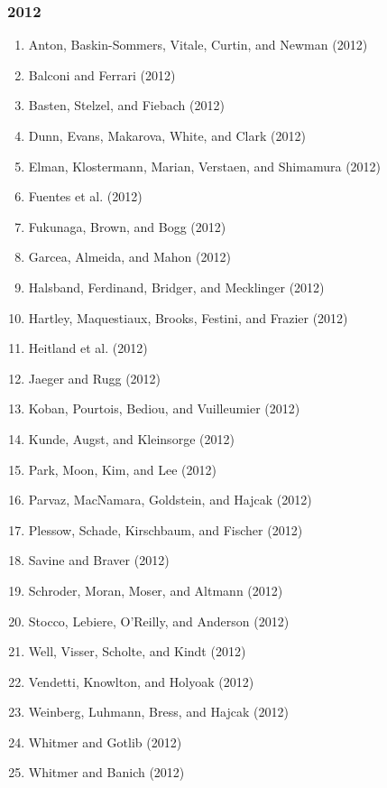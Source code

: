 \documentclass[english,man]{apa6}
\providecommand{\tightlist}{%
  \setlength{\itemsep}{0pt}\setlength{\parskip}{0pt}}
\theoremstyle{definition}
\theoremstyle{definition}
\theoremstyle{definition}
\theoremstyle{remark}
\begin{document}
\subsubsection{2012}\label{section-36}

\begin{enumerate}
\def\labelenumi{\arabic{enumi})}
\tightlist
\item
  Anton, Baskin-Sommers, Vitale, Curtin, and Newman (2012)
\item
  Balconi and Ferrari (2012)
\item
  Basten, Stelzel, and Fiebach (2012)
\item
  Dunn, Evans, Makarova, White, and Clark (2012)
\item
  Elman, Klostermann, Marian, Verstaen, and Shimamura (2012)
\item
  Fuentes et al. (2012)
\item
  Fukunaga, Brown, and Bogg (2012)
\item
  Garcea, Almeida, and Mahon (2012)
\item
  Halsband, Ferdinand, Bridger, and Mecklinger (2012)
\item
  Hartley, Maquestiaux, Brooks, Festini, and Frazier (2012)
\item
  Heitland et al. (2012)
\item
  Jaeger and Rugg (2012)
\item
  Koban, Pourtois, Bediou, and Vuilleumier (2012)
\item
  Kunde, Augst, and Kleinsorge (2012)
\item
  Park, Moon, Kim, and Lee (2012)
\item
  Parvaz, MacNamara, Goldstein, and Hajcak (2012)
\item
  Plessow, Schade, Kirschbaum, and Fischer (2012)
\item
  Savine and Braver (2012)
\item
  Schroder, Moran, Moser, and Altmann (2012)
\item
  Stocco, Lebiere, O'Reilly, and Anderson (2012)
\item
  Well, Visser, Scholte, and Kindt (2012)
\item
  Vendetti, Knowlton, and Holyoak (2012)
\item
  Weinberg, Luhmann, Bress, and Hajcak (2012)
\item
  Whitmer and Gotlib (2012)
\item
  Whitmer and Banich (2012)
\end{enumerate}
\end{document}
